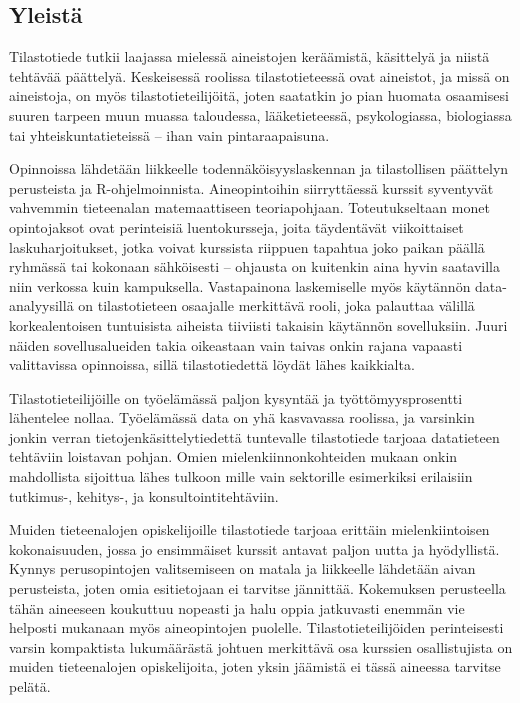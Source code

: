 \documentclass[../ala_hataile.tex]{subfiles}
\begin{document}
\raggedbottom
\clearpage

\subsection*{Yleistä}
Tilastotiede tutkii laajassa mielessä aineistojen keräämistä, käsittelyä ja niistä tehtävää päättelyä. Keskeisessä roolissa tilasto\-tieteessä ovat aineistot, ja missä on aineistoja, on myös tilastotieteilijöitä, joten saatatkin jo pian huomata osaamisesi suuren tarpeen muun muassa taloudessa, lääke\-tieteessä, psykologiassa, biologiassa tai yhteis\-kunta\-tieteissä -- ihan vain pinta\-raapaisuna.

Opinnoissa lähdetään liikkeelle toden\-näköisyys\-laskennan ja tilastollisen päättelyn perusteista ja R-ohjelmoinnista. Aine\-opintoihin siirryttäessä kurssit syventyvät vahvemmin tieteen\-alan matemaattiseen teoria\-pohjaan. Toteutukseltaan monet opinto\-jaksot ovat perinteisiä luento\-kursseja, joita täydentävät viikoittaiset lasku\-harjoitukset, jotka voivat kurssista riippuen tapahtua joko paikan päällä ryhmässä tai kokonaan sähköisesti -- ohjausta on kuitenkin aina hyvin saatavilla niin verkossa kuin kampuksella. Vastapainona laskemiselle myös käytännön data-analyysillä on tilastotieteen osaajalle merkittävä rooli, joka palauttaa välillä korkealentoisen tuntuisista aiheista tiiviisti takaisin käytännön sovelluksiin. Juuri näiden sovellusalueiden takia oikeastaan vain taivas onkin rajana vapaasti valittavissa opinnoissa, sillä tilastotiedettä löydät lähes kaikkialta.

Tilastotieteilijöille on työelämässä paljon kysyntää ja työttömyysprosentti lähentelee nollaa. Työelämässä data on yhä kasvavassa roolissa, ja varsinkin jonkin verran tietojenkäsittelytiedettä tuntevalle tilastotiede tarjoaa datatieteen tehtäviin loistavan pohjan. Omien mielenkiinnonkohteiden mukaan onkin mahdollista sijoittua lähes tulkoon mille vain sektorille esimerkiksi erilaisiin tutkimus-, kehitys-, ja konsultointitehtäviin.

Muiden tieteenalojen opiskelijoille tilastotiede tarjoaa erittäin mielenkiintoisen kokonaisuuden, jossa jo ensimmäiset kurssit antavat paljon uutta ja hyödyllistä. Kynnys perusopintojen valitsemiseen on matala ja liikkeelle lähdetään aivan perusteista, joten omia esitietojaan ei tarvitse jännittää. Kokemuksen perusteella tähän aineeseen koukuttuu nopeasti ja halu oppia jatkuvasti enemmän vie helposti mukanaan myös aineopintojen puolelle. Tilastotieteilijöiden perinteisesti varsin kompaktista lukumäärästä johtuen merkittävä osa kurssien osallistujista on muiden tieteenalojen opiskelijoita, joten yksin jäämistä ei tässä aineessa tarvitse pelätä. 
\end{document}
